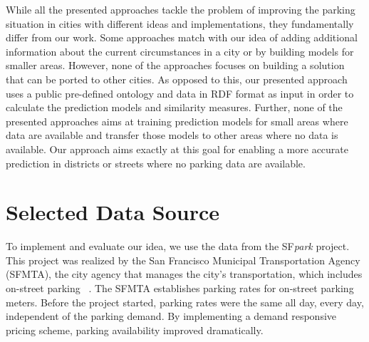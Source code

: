While all the presented approaches tackle the problem of improving the parking situation in cities with different ideas and implementations, they fundamentally differ from our work. 
Some approaches match with our idea of adding additional information about the current circumstances in a city or by building models for smaller areas.
However, none of the approaches focuses on building a solution that can be ported to other cities. 
As opposed to this, our presented approach uses a public pre-defined ontology and data in RDF format as input in order to calculate the prediction models and similarity measures. 
Further, none of the presented approaches aims at training prediction models for small areas where data are available and transfer those models to other areas where no data is available. Our approach aims exactly at this goal for enabling a more accurate prediction in districts or streets where no parking data are available. 

\section{Selected Data Source}
To implement and evaluate our idea, we use the data from the SF\textit{park} project. This project was realized by the San Francisco Municipal Transportation Agency (SFMTA), the city agency that manages the city's transportation, which includes on-street parking~\cite{sfpark} \cite{sfpark_evaluation}. The SFMTA establishes parking rates for on-street parking meters. Before the project started, parking rates were the same all day, every day, independent of the parking demand. By implementing a demand responsive pricing scheme, parking availability improved dramatically. 

